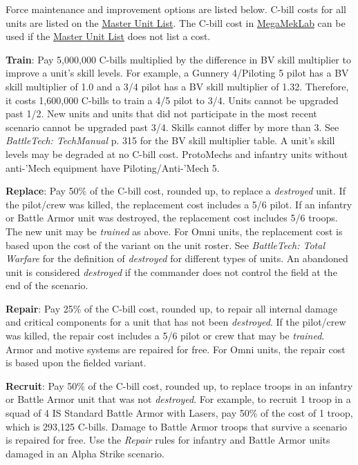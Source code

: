 Force maintenance and improvement options are listed below.
C-bill costs for all units are listed on the \href{http://www.masterunitlist.info}{Master Unit List}.
The C-bill cost in \href{https://megamek.org}{MegaMekLab} can be used if the \href{http://www.masterunitlist.info}{Master Unit List} does not list a cost.

\begin{description}

\item {\bfseries Train}: Pay 5,000,000 C-bills multiplied by the difference in BV skill multiplier to improve a unit's skill levels.
For example, a Gunnery 4/Piloting 5 pilot has a BV skill multiplier of 1.0 and a 3/4 pilot has a BV skill multiplier of 1.32.
Therefore, it costs 1,600,000 C-bills to train a 4/5 pilot to 3/4.
Units cannot be upgraded past 1/2.
New units and units that did not participate in the most recent scenario cannot be upgraded past 3/4.
Skills cannot differ by more than 3.
See \emph{BattleTech: TechManual} p. 315 for the BV skill multiplier table.
A unit's skill levels may be degraded at no C-bill cost.
ProtoMechs and infantry units without anti-'Mech equipment have Piloting/Anti-'Mech 5.

\item {\bfseries Replace}: Pay 50\% of the C-bill cost, rounded up, to replace a \emph{destroyed} unit.
If the pilot/crew was killed, the replacement cost includes a 5/6 pilot.
If an infantry or Battle Armor unit was destroyed, the replacement cost includes 5/6 troops.
The new unit may be \emph{trained} as above.
For Omni units, the replacement cost is based upon the cost of the variant on the unit roster.
See \emph{BattleTech: Total Warfare} for the definition of \emph{destroyed} for different types of units.
An abandoned unit is considered \emph{destroyed} if the commander does not control the field at the end of the scenario.

\item {\bfseries Repair}: Pay 25\% of the C-bill cost, rounded up, to repair all internal damage and critical components for a unit that has not been \emph{destroyed}.
If the pilot/crew was killed, the repair cost includes a 5/6 pilot or crew that may be \emph{trained}.
Armor and motive systems are repaired for free.
For Omni units, the repair cost is based upon the fielded variant.

\item {\bfseries Recruit}: Pay 50\% of the C-bill cost, rounded up, to replace troops in an infantry or Battle Armor unit that was not \emph{destroyed}.
For example, to recruit 1 troop in a squad of 4 IS Standard Battle Armor with Lasers, pay 50\% of the cost of 1 troop, which is 293,125 C-bills.
Damage to Battle Armor troops that survive a scenario is repaired for free.
Use the \emph{Repair} rules for infantry and Battle Armor units damaged in an Alpha Strike scenario.


\end{description}
